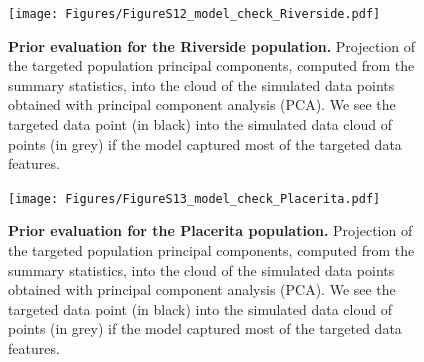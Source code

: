 \documentclass[a4paper, 12pt]{article}
\begin{document}
\begin{figure}[ht]
  \centering
  \texttt{[image: Figures/FigureS12\_model\_check\_Riverside.pdf]}
  \small\caption{\textbf{Prior evaluation for the Riverside population.} Projection of the targeted population principal components, computed from the summary statistics, into the cloud of the simulated data points obtained with principal component analysis (PCA). We see the targeted data point (in black) into the simulated data cloud of points (in grey) if the model captured most of the targeted data features.}
  \label{fig:supple_model_check_riverside}
\end{figure}

\begin{figure}[ht]
  \centering
  \texttt{[image: Figures/FigureS13\_model\_check\_Placerita.pdf]}
  \small\caption{\textbf{Prior evaluation for the Placerita population.} Projection of the targeted population principal components, computed from the summary statistics, into the cloud of the simulated data points obtained with principal component analysis (PCA). We see the targeted data point (in black) into the simulated data cloud of points (in grey) if the model captured most of the targeted data features.}
  \label{fig:supple_model_check_placerita}
\end{figure}
\end{document}
